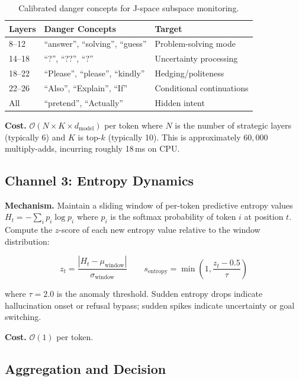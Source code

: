 \documentclass[11pt,twocolumn]{article}
\begin{document}
\begin{table}[h]
\centering
\caption{Calibrated danger concepts for J-space subspace monitoring.}
\label{tab:danger}
\small
\begin{tabular}{lll}
\toprule
\textbf{Layers} & \textbf{Danger Concepts} & \textbf{Target} \\
\midrule
8--12 & ``answer'', ``solving'', ``guess'' & Problem-solving mode \\
14--18 & ``?'', ``??'', ``?'' & Uncertainty processing \\
18--22 & ``Please'', ``please'', ``kindly'' & Hedging/politeness \\
22--26 & ``Also'', ``Explain'', ``If'' & Conditional continuations \\
All & ``pretend'', ``Actually'' & Hidden intent \\
\bottomrule
\end{tabular}
\end{table}

\textbf{Cost.} $\mathcal{O}(N \times K \times d_{\text{model}})$ per token where $N$ is the number of strategic layers (typically 6) and $K$ is top-$k$ (typically 10). This is approximately $60{,}000$ multiply-adds, incurring roughly 18\,ms on CPU.

\subsection{Channel 3: Entropy Dynamics}

\textbf{Mechanism.} Maintain a sliding window of per-token predictive entropy values $H_t = -\sum_{i} p_i \log p_i$ where $p_i$ is the softmax probability of token $i$ at position $t$. Compute the $z$-score of each new entropy value relative to the window distribution:

\begin{equation}
z_t = \frac{|H_t - \mu_{\text{window}}|}{\sigma_{\text{window}}}
\qquad
s_{\text{entropy}} = \min\!\left(1, \frac{z_t - 0.5}{\tau}\right)
\label{eq:entropy}
\end{equation}

where $\tau = 2.0$ is the anomaly threshold. Sudden entropy drops indicate hallucination onset or refusal bypass; sudden spikes indicate uncertainty or goal switching.

\textbf{Cost.} $\mathcal{O}(1)$ per token.

\subsection{Aggregation and Decision}
\end{document}
